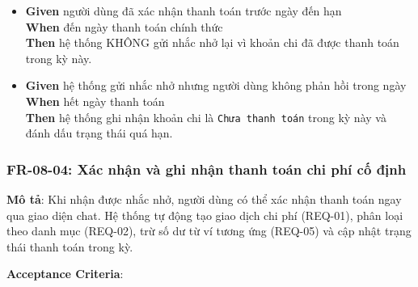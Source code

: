 \begin{itemize}
\item \textbf{Given} người dùng đã xác nhận thanh toán trước ngày đến hạn  \\ \hspace*{1.5em}  \textbf{When} đến ngày thanh toán chính thức  \\ \hspace*{1.5em}  \textbf{Then} hệ thống KHÔNG gửi nhắc nhở lại vì khoản chi đã được thanh toán trong kỳ này.
\item \textbf{Given} hệ thống gửi nhắc nhở nhưng người dùng không phản hồi trong ngày  \\ \hspace*{1.5em}  \textbf{When} hết ngày thanh toán  \\ \hspace*{1.5em}  \textbf{Then} hệ thống ghi nhận khoản chi là \texttt{Chưa thanh toán} trong kỳ này và đánh dấu trạng thái quá hạn.
\end{itemize}
\subsubsection{FR-08-04: Xác nhận và ghi nhận thanh toán chi phí cố định}

\textbf{Mô tả}: Khi nhận được nhắc nhở, người dùng có thể xác nhận thanh toán ngay qua giao diện chat. Hệ thống tự động tạo giao dịch chi phí (REQ-01), phân loại theo danh mục (REQ-02), trừ số dư từ ví tương ứng (REQ-05) và cập nhật trạng thái thanh toán trong kỳ.



\textbf{Acceptance Criteria}:

